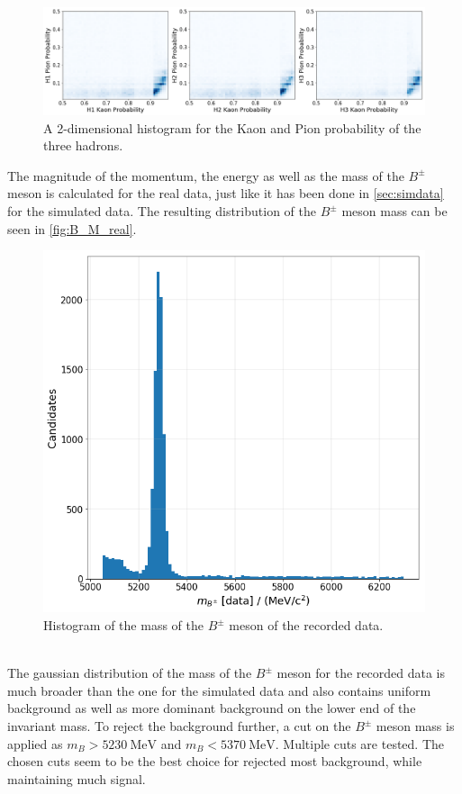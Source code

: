 \begin{figure}
  \centering
  \includegraphics[width = 1\textwidth]{"content/pics/ProbKPi.png"}

  \caption{A 2-dimensional histogram for the Kaon and Pion probability of the three hadrons.}
  \label{fig:ProbKPi}
\end{figure}
The magnitude of the momentum, the energy as well as the mass of the $B^{\pm}$ meson is calculated for the real data, just like it has been done in \autoref{sec:simdata} for the simulated data.
The resulting distribution of the $B^{\pm}$ meson mass can be seen in \autoref{fig:B_M_real}.
\begin{figure}
  \centering
  \includegraphics[width = .5\textwidth]{"content/pics/B_M_real.png"}
  \caption{Histogram of the mass of the $B^{\pm}$ meson of the recorded data.}
  \label{fig:B_M_real}
\end{figure}
\\ The gaussian distribution of the mass of the $B^{\pm}$ meson for the recorded data is much broader than the one for the simulated data and also contains uniform background as well as more dominant background on the lower end of the invariant mass.
To reject the background further, a cut on the $B^{\pm}$ meson mass is applied as $m_B > \qty{5230}{\mega\electronvolt}$ and $m_B < \qty{5370}{\mega\electronvolt}$. Multiple 
cuts are tested. The chosen cuts seem to be the best choice for rejected most background, while maintaining much signal.\\

